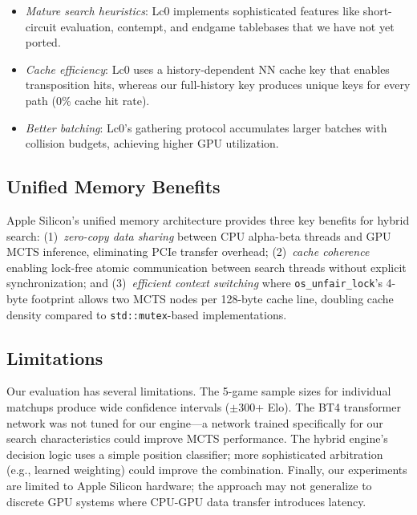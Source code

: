 \documentclass{svproc}
\begin{document}
\begin{itemize}
    \item \emph{Mature search heuristics}: Lc0 implements sophisticated features like short-circuit evaluation, contempt, and endgame tablebases that we have not yet ported.
    \item \emph{Cache efficiency}: Lc0 uses a history-dependent NN cache key that enables transposition hits, whereas our full-history key produces unique keys for every path (0\% cache hit rate).
    \item \emph{Better batching}: Lc0's gathering protocol accumulates larger batches with collision budgets, achieving higher GPU utilization.
\end{itemize}

\subsection{Unified Memory Benefits}

Apple Silicon's unified memory architecture provides three key benefits for hybrid search: (1)~\emph{zero-copy data sharing} between CPU alpha-beta threads and GPU MCTS inference, eliminating PCIe transfer overhead; (2)~\emph{cache coherence} enabling lock-free atomic communication between search threads without explicit synchronization; and (3)~\emph{efficient context switching} where \texttt{os\_unfair\_lock}'s 4-byte footprint allows two MCTS nodes per 128-byte cache line, doubling cache density compared to \texttt{std::mutex}-based implementations.

\subsection{Limitations}

Our evaluation has several limitations. The 5-game sample sizes for individual matchups produce wide confidence intervals ($\pm$300+ Elo). The BT4 transformer network was not tuned for our engine---a network trained specifically for our search characteristics could improve MCTS performance. The hybrid engine's decision logic uses a simple position classifier; more sophisticated arbitration (e.g., learned weighting) could improve the combination. Finally, our experiments are limited to Apple Silicon hardware; the approach may not generalize to discrete GPU systems where CPU-GPU data transfer introduces latency.

\end{document}
